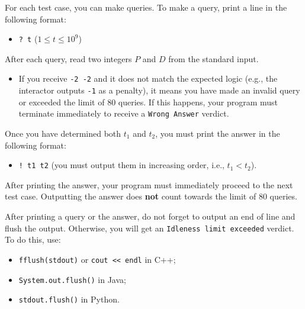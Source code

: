 For each test case, you can make queries. To make a query, print a line in the following format:
\begin{itemize}
    \item \texttt{? t} ($1 \le t \le 10^9$)
\end{itemize}

After each query, read two integers $P$ and $D$ from the standard input. 
\begin{itemize}
    \item If you receive \texttt{-2 -2} and it does not match the expected logic (e.g., the interactor outputs \texttt{-1} as a penalty), it means you have made an invalid query or exceeded the limit of 80 queries. If this happens, your program must terminate immediately to receive a \texttt{Wrong Answer} verdict.
\end{itemize}

Once you have determined both $t_1$ and $t_2$, you must print the answer in the following format:
\begin{itemize}
    \item \texttt{! t1 t2} (you must output them in increasing order, i.e., $t_1 < t_2$).
\end{itemize}

After printing the answer, your program must immediately proceed to the next test case. Outputting the answer does \textbf{not} count towards the limit of 80 queries.

After printing a query or the answer, do not forget to output an end of line and flush the output. Otherwise, you will get an \texttt{Idleness limit exceeded} verdict. To do this, use:
\begin{itemize}
    \item \texttt{fflush(stdout)} or \texttt{cout << endl} in C++;
    \item \texttt{System.out.flush()} in Java;
    \item \texttt{stdout.flush()} in Python.
\end{itemize}